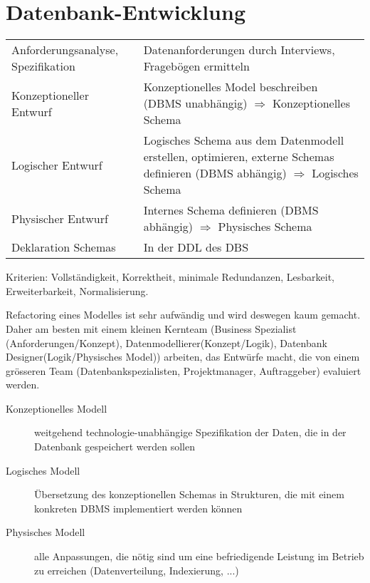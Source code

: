 \section{Datenbank-Entwicklung}
\settowidth{\MyLenA}{Anforderungsanalyse~~}
\begin{tabular}{
	@{}p{\the\MyLenA}%
	@{}p{\linewidth-\the\MyLenA}}
	Anforderungsanalyse, Spezifikation & Datenanforderungen durch Interviews, Fragebögen ermitteln\\
	Konzeptioneller Entwurf & Konzeptionelles Model beschreiben (DBMS unabhängig) $\Rightarrow$ Konzeptionelles Schema\\
	Logischer Entwurf & Logisches Schema aus dem Datenmodell erstellen, optimieren, externe Schemas definieren (DBMS abhängig) $\Rightarrow$ Logisches Schema\\ 
	Physischer Entwurf & Internes Schema definieren (DBMS abhängig) $\Rightarrow$ Physisches Schema\\
	Deklaration Schemas & In der DDL des DBS\\
\end{tabular}

Kriterien: Vollständigkeit, Korrektheit, minimale Redundanzen, Lesbarkeit, Erweiterbarkeit, Normalisierung.

Refactoring eines Modelles ist sehr aufwändig und wird deswegen kaum gemacht. Daher am besten mit einem kleinen
Kernteam (Business Spezialist (Anforderungen/Konzept), Datenmodellierer(Konzept/Logik), Datenbank Designer(Logik/Physisches Model)) arbeiten, das Entwürfe macht, die von einem grösseren Team
(Datenbankspezialisten, Projektmanager, Auftraggeber) evaluiert werden.

\begin{description}
	\item [Konzeptionelles Modell] weitgehend technologie-unabhängige Spezifikation der Daten, die in der Datenbank
		gespeichert werden sollen
	\item [Logisches Modell] Übersetzung des konzeptionellen Schemas in Strukturen, 
		die mit einem konkreten DBMS implementiert werden können
	\item [Physisches Modell] alle Anpassungen, die nötig sind um eine befriedigende Leistung im Betrieb zu erreichen
		(Datenverteilung,  Indexierung,  ...)
\end{description}

